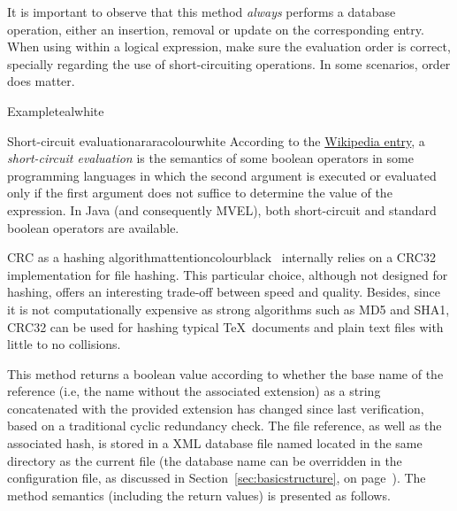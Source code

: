\begin{description}
\vspace{1.4em}

It is important to observe that this method \emph{always} performs a database operation, either an insertion, removal or update on the corresponding entry. When using  within a logical expression, make sure the evaluation order is correct, specially regarding the use of short-circuiting operations. In some scenarios, order does matter.

\begin{codebox}{Example}{teal}{\icnote}{white}
\end{codebox}

\begin{messagebox}{Short-circuit evaluation}{araracolour}{\icok}{white}
According to the \href{https://en.wikipedia.org/wiki/Short-circuit_evaluation}{Wikipedia entry}, a \emph{short-circuit evaluation} is the semantics of some boolean operators in some programming languages in which the second argument is executed or evaluated only if the first argument does not suffice to determine the value of the expression. In Java (and consequently \gls{MVEL}), both short-circuit and standard boolean operators are available.
\end{messagebox}

\begin{messagebox}{CRC as a hashing algorithm}{attentioncolour}{\icattention}{black}
\arara\ internally relies on a CRC32 implementation for file hashing. This particular choice, although not designed for hashing, offers an interesting trade-off between speed and quality. Besides, since it is not computationally expensive as strong algorithms such as MD5 and SHA1, CRC32 can be used for hashing typical \TeX\ documents and plain text files with little to no collisions.
\end{messagebox}

\item[\mddbox{C}{R}{changed(String extension)}{boolean}] This method returns a boolean value according to whether the base name of the  reference (i.e, the name without the associated extension) as a string concatenated with the provided  extension has changed since last verification, based on a traditional cyclic redundancy check. The file reference, as well as the associated hash, is stored in a \gls{XML} database file named  located in the same directory as the current file (the database name can be overridden in the configuration file, as discussed in Section~\ref{sec:basicstructure}, on page~\pageref{sec:basicstructure}). The method semantics (including the return values) is presented as follows.


\end{description}
